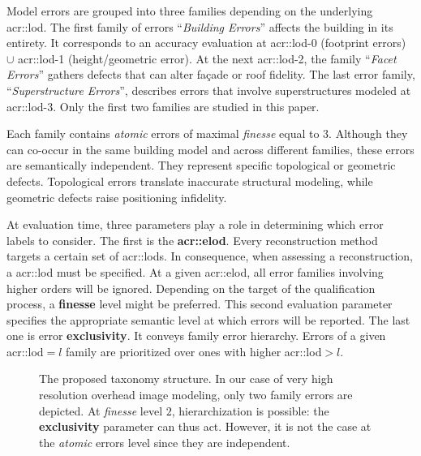         Model errors are grouped into three families depending on the underlying \gls{acr::lod}.
        The first family of errors ``\textit{Building Errors}'' affects the building in its entirety.
        It corresponds to an accuracy evaluation at \gls{acr::lod}-$0$ (footprint errors) $\cup$ \gls{acr::lod}-1 (height/geometric error).
        At the next \gls{acr::lod}-2, the family ``\textit{Facet Errors}'' gathers defects that can alter fa\c{c}ade or roof fidelity.
        The last error family, ``\textit{Superstructure Errors}'', describes errors that involve superstructures modeled at \gls{acr::lod}-3.
        Only the first two families are studied in this paper.

        Each family contains \textit{atomic} errors of maximal \textit{finesse} equal to $3$. Although they can co-occur in the same building model and across different families, these errors are semantically independent. They represent specific topological or geometric defects. Topological errors translate inaccurate structural modeling, while geometric defects raise positioning infidelity.

        At evaluation time, three parameters play a role in determining which error labels to consider. The first is the \textbf{\gls{acr::elod}}. Every reconstruction method targets a certain set of \glspl*{acr::lod}. In consequence, when assessing a reconstruction, a \gls{acr::lod} must be specified. At a given \gls{acr::elod}, all error families involving higher orders will be ignored. Depending on the target of the qualification process, a \textbf{finesse} level might be preferred. This second evaluation parameter specifies the appropriate semantic level at which errors will be reported. The last one is error \textbf{exclusivity}. It conveys family error hierarchy. Errors of a given \gls{acr::lod}$ = l$ family are prioritized over ones with higher \gls{acr::lod}$ > l$.

    \begin{figure}
        \begin{center}
            
            \caption{
                \label{fig::taxonomy} 
                The proposed taxonomy structure.
                In our case of very high resolution overhead image modeling, only two family errors are depicted.
                At \textit{finesse} level $2$, hierarchization is possible: the \textbf{exclusivity} parameter can thus act.
                However, it is not the case at the \textit{atomic} errors level since they are independent.
            }
        \end{center}
    \end{figure}

